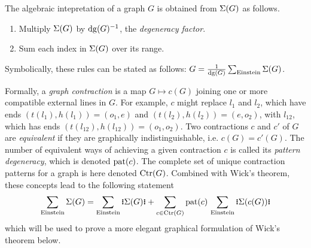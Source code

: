 \documentclass[11pt]{article}
\numberwithin{equation}{section}
\begin{document}
\begin{ax}\label{ax:rules-of-interpretation}
The algebraic intepretation of a graph $G$ is obtained from $\Sigma (G)$ as follows.
\begin{enumerate}
  \item Multiply $\Sigma (G)$ by $\mathrm{dg}(G)^{-1}$, the \textit{degeneracy factor}.
  \item Sum each index in $\Sigma (G)$ over its range.
\end{enumerate}
Symbolically, these rules can be stated as follows: $G=\frac {1}{\mathrm{dg}(G)}\sum_{\mathrm{Einstein}}\Sigma (G)$.
\end{ax}


\begin{dfn}
Formally, a \textit{graph contraction} is a map $G\mapsto c(G)$ joining one or more compatible external lines in $G$.
For example, $c$ might replace $l_1$ and $l_2$, which have ends $(t(l_1),h(l_1))=(o_1,e)$ and $(t(l_2),h(l_2))=(e,o_2)$, with $l_{12}$, which has ends $(t(l_{12}),h(l_{12}))=(o_1,o_2)$.
Two contractions $c$ and $c'$ of $G$ are \textit{equivalent} if they are graphically indistinguishable, i.e. $c(G)=c'(G)$.
The number of equivalent ways of achieving a given contraction $c$ is called its \textit{pattern degeneracy}, which is denoted $\mathrm{pat}(c)$.
The complete set of unique contraction patterns for a graph is here denoted $\mathrm{Ctr}(G)$.
Combined with Wick's theorem, these concepts lead to the following statement
\begin{align}\label{eq:wicks-theorem-for-summand-graphs}
  \sum_{\mr{Einstein}}
  \Si(G)
=
  \sum_{\mr{Einstein}}
  \gno{\Si(G)}
+
  \sum_{c\in\mr{Ctr}(G)}
  \mr{pat}(c)\,
  \sum_{\mr{Einstein}}
  \gno{\Si(c(G))}
\end{align}
which will be used to prove a more elegant graphical formulation of Wick's theorem below.
\end{dfn}
\end{document}
